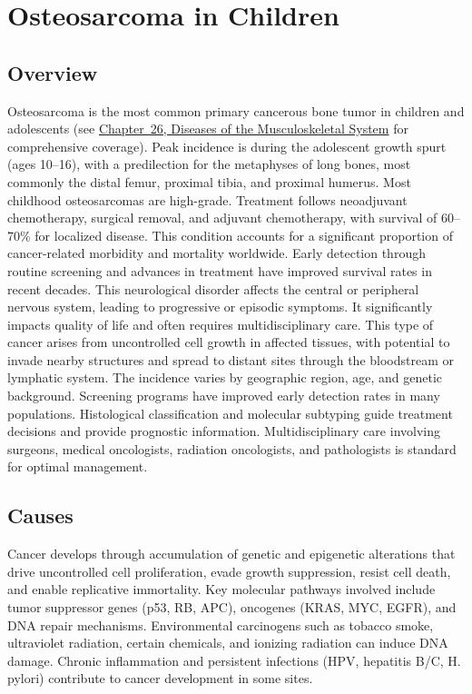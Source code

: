 \chapter{Osteosarcoma in Children}
\label{sec:Osteosarcoma in Children}

\section{Overview}
Osteosarcoma is the most common primary cancerous bone tumor in children and adolescents (see \hyperref[ch:bones]{Chapter~26, Diseases of the Musculoskeletal System} for comprehensive coverage). Peak incidence is during the adolescent growth spurt (ages 10--16), with a predilection for the metaphyses of long bones, most commonly the distal femur, proximal tibia, and proximal humerus. Most childhood osteosarcomas are high-grade. Treatment follows neoadjuvant chemotherapy, surgical removal, and adjuvant chemotherapy, with survival of 60--70\% for localized disease. This condition accounts for a significant proportion of cancer-related morbidity and mortality worldwide. Early detection through routine screening and advances in treatment have improved survival rates in recent decades. This neurological disorder affects the central or peripheral nervous system, leading to progressive or episodic symptoms. It significantly impacts quality of life and often requires multidisciplinary care. This type of cancer arises from uncontrolled cell growth in affected tissues, with potential to invade nearby structures and spread to distant sites through the bloodstream or lymphatic system. The incidence varies by geographic region, age, and genetic background. Screening programs have improved early detection rates in many populations. Histological classification and molecular subtyping guide treatment decisions and provide prognostic information. Multidisciplinary care involving surgeons, medical oncologists, radiation oncologists, and pathologists is standard for optimal management.
\section{Causes}
Cancer develops through accumulation of genetic and epigenetic alterations that drive uncontrolled cell proliferation, evade growth suppression, resist cell death, and enable replicative immortality. Key molecular pathways involved include tumor suppressor genes (p53, RB, APC), oncogenes (KRAS, MYC, EGFR), and DNA repair mechanisms. Environmental carcinogens such as tobacco smoke, ultraviolet radiation, certain chemicals, and ionizing radiation can induce DNA damage. Chronic inflammation and persistent infections (HPV, hepatitis B/C, H. pylori) contribute to cancer development in some sites.
